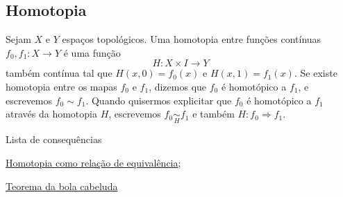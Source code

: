 \subsection{Homotopia}
\label{homotopia-def}
\begin{defi}[Homotopia]
	Sejam $X$ e $Y$ espaços topológicos. Uma homotopia entre funções contínuas $f_0, f_1: X\rightarrow Y$ é uma função $$H:X\times I\rightarrow Y$$ também contínua tal que $H(x,0)=f_0(x)$ e $H(x,1)=f_1(x)$. Se existe homotopia entre os mapas $f_0$ e $f_1$, dizemos que $f_0$ é homotópico a $f_1$, e escrevemos $f_0\sim f_1$. Quando quisermos explicitar que $f_0$ é homotópico a $f_1$ através da homotopia $H$, escrevemos $f_0 \underset{H}{\sim} f_1$ e também $H:f_0\Rightarrow f_1$.
\end{defi}

\begin{titlemize}{Lista de consequências}
	\item \hyperref[homotopia-relaçao-de-equivalencia-prop]{Homotopia como relação de equivalência};\\ %
	\item \hyperref[homotopia-teorema-da-bola-cabeluda]{Teorema da bola cabeluda}
\end{titlemize}

